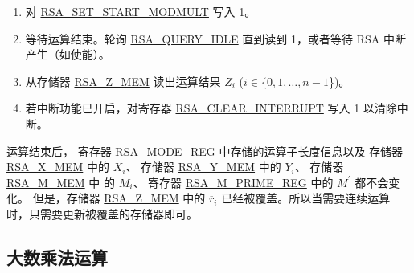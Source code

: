 \documentclass[main\_\_CN.tex]{subfiles}
\begin{document}
\begin{enumerate}
        只需要根据运算子长度，将各个运算子中有效的数据写入存储器，
        没有使用到的存储器可以是任意值。

    \item 对 \hyperref[fielddesc:RSASETSTARTMODMULT]{RSA\_SET\_START\_MODMULT} 写入 1。

    \item 等待运算结束。轮询 \hyperref[fielddesc:RSAQUERYIDLE]{RSA\_QUERY\_IDLE} 直到读到 1，或者等待 RSA 中断产生（如使能）。

    \item 从存储器 \hyperref[regdesc:RSAmemory]{RSA\_Z\_MEM} 读出运算结果 \begin{math}Z_{i}\end{math} (\begin{math}i \in \{ 0, 1, \dots, n-1 \end{math}\})。

    \item 若中断功能已开启，对寄存器 \hyperref[fielddesc:RSACLEARINTERRUPT]{RSA\_CLEAR\_INTERRUPT} 写入 1 以清除中断。

\end{enumerate}


运算结束后，
寄存器 \hyperref[regdesc:RSAMODEREG]{RSA\_MODE\_REG} 中存储的运算子长度信息以及
存储器 \hyperref[regdesc:RSAmemory]{RSA\_X\_MEM} 中的 \begin{math}X_{i}\end{math}、
存储器 \hyperref[regdesc:RSAmemory]{RSA\_Y\_MEM} 中的 \begin{math}Y_{i}\end{math}、
存储器 \hyperref[regdesc:RSAmemory]{RSA\_M\_MEM} 中 的 \begin{math}M_{i}\end{math}、
寄存器 \hyperref[regdesc:RSAMPRIMEREG]{RSA\_M\_PRIME\_REG} 中的 \begin{math}M^{\prime}\end{math} 都不会变化。
但是，存储器 \hyperref[regdesc:RSAmemory]{RSA\_Z\_MEM} 中的 \begin{math}\overline{r}_{i}\end{math}
已经被覆盖。所以当需要连续运算时，只需要更新被覆盖的存储器即可。


\subsection{大数乘法运算}
\end{document}
